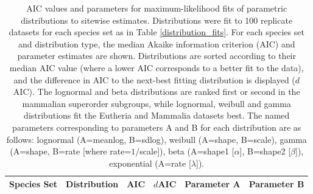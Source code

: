 \begin{table}
\centering \footnotesize
\begin{tabular}{llrrrr}
\toprule
Species Set & Distribution & AIC & $d$AIC & Parameter A & Parameter B
\\
  \midrule

\bottomrule
\end{tabular}
\caption{ \scriptsize AIC values and parameters for maximum-likelihood fits of
  parametric distributions to sitewise \ci estimates. Distributions
  were fit to 100 replicate datasets for each species set as in Table
  \ref{distribution_fits}. For each species set and distribution type,
  the median Akaike information criterion (AIC) and parameter
  estimates are shown. Distributions are sorted according to their
  median AIC value (where a lower AIC corresponds to a better fit to
  the data), and the difference in AIC to the next-best fitting
  distribution is displayed ($d$AIC). The lognormal and beta
  distributions are ranked first or second in the mammalian superorder
  subgroups, while lognormal, weibull and gamma distributions fit the
  Eutheria and Mammalia datasets best. The named parameters
  corresponding to parameters A and B for each distribution are as
  follows: lognormal (A=meanlog, B=sdlog), weibull (A=shape, B=scale),
  gamma (A=shape, B=rate [where rate=$1/$scale]), beta (A=shape1
  [$\alpha$], B=shape2 [$\beta$]), exponential (A=rate [$\lambda$]).}
\label{distribution_params}
\end{table}

